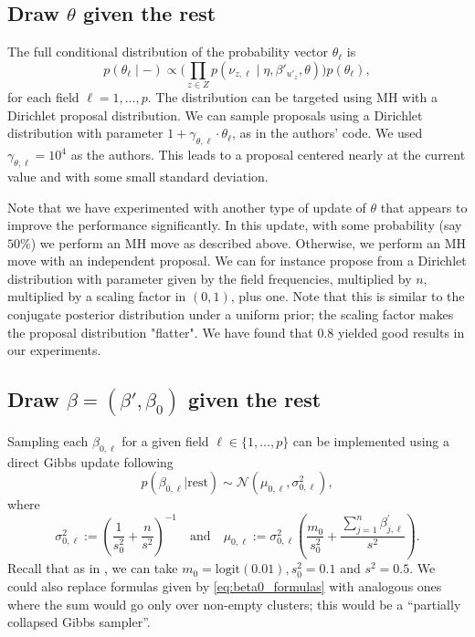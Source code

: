 \documentclass{article}
\begin{document}
\subsection{Draw \texorpdfstring{$\theta$}{theta} given the rest}

The full conditional distribution of the probability vector $\theta_\ell$ is 
\begin{equation}
    \label{eq:theta_conditional}
    p(\theta_\ell \mid - ) \propto \Big( \prod_{z \in Z} p(\nu_{z,\ell} \mid \eta, \beta'_{u'_z},\theta)\Big)  p(\theta_\ell),
\end{equation}
for each field $\ell = 1,\ldots, p$. The distribution
can be targeted using MH with a Dirichlet proposal distribution.
We can sample proposals using a Dirichlet distribution
with parameter $1+\gamma_{\theta,\ell}\cdot \theta_\ell$,
as in the authors' code. We used $\gamma_{\theta,\ell} = 10^4$
as the authors. This leads to a proposal centered nearly
at the current value and with some small standard deviation.

Note that we have experimented with another type of update of $\theta$
that appears to improve the performance significantly. In this update,
with some probability (say $50\%$) we perform an MH move as described above.
Otherwise, we perform an MH move with an independent proposal.
We can for instance propose from a Dirichlet distribution with parameter 
given by the field frequencies, multiplied by $n$, multiplied by a scaling
factor in $(0,1)$, plus one. Note that this is similar to the conjugate posterior distribution under a uniform prior; the scaling factor makes the proposal
distribution "flatter". We have found that $0.8$ yielded good results
in our experiments.

\subsection{Draw \texorpdfstring{$\beta = (\beta', \beta_0)$}{beta} given the rest}

Sampling each $\beta_{0,\ell}$ for a given field $\ell \in \{ 1, \ldots, p \} $ can be implemented using a direct Gibbs update following
$$p\left(\beta_{0,\ell}|\text{rest}\right)\sim \mathcal{N}(\mu_{0,\ell}, \sigma_{0,\ell}^2),$$
where
\begin{equation}\label{eq:beta0_formulas}
\sigma_{0,\ell}^2 := \left(\frac{1}{s_0^2} + \frac{n}{s^2} \right)^{-1} \quad \text{and} \quad \mu_{0,\ell} := \sigma_{0,\ell}^2 \left(\frac{m_0}{s_0^2} + \frac{\sum_{j=1}^{n} \beta^{'}_{j,\ell}}{s^2} \right).
\end{equation}
Recall that as in \citet{tancredi2018unified}, we
can take $m_0 = \text{logit}(0.01), s_0^2 = 0.1$ and $s^2 =0.5$. We could also replace formulas given by \eqref{eq:beta0_formulas} with analogous ones where the sum
would go only over non-empty clusters; this would be 
a ``partially collapsed Gibbs sampler''.
\end{document}
